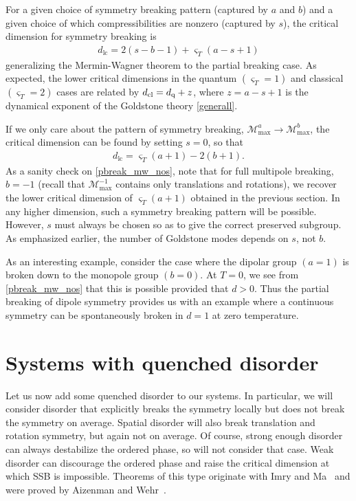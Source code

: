 \documentclass[prb,aps,twocolumn, amsfonts,amsmath,amssymb,nofootinbib,superscriptaddress]{revtex4-2}
\renewcommand{\max}{\text{max}}
\newcommand{\mmax}[1]{\mathcal{M}^{#1}_\max}
\begin{document}
For a given choice of symmetry breaking pattern (captured by $a$ and $b$) and a given choice of which compressibilities are nonzero (captured by $s$), the critical dimension for symmetry breaking is
\begin{align}
d_\text{lc} = 2(s - b-1) + \varsigma_T (a-s+1) \label{pbreak_mw} 
\end{align}
generalizing the Mermin-Wagner theorem to the partial breaking case. 
As expected, the lower critical dimensions in the quantum $(\varsigma_T = 1)$ and classical $(\varsigma_T = 2)$ cases are related by $d_{\rm cl} = d_{\rm q} + z$, where $z=a-s+1$ is the dynamical exponent of the Goldstone theory \eqref{generall}. 

If we only care about the pattern of symmetry breaking, $\mmax{a}\rightarrow \mmax{b}$, the critical dimension can be found by setting $s=0$, so that
\begin{align}
d_\text{lc} = \varsigma_T (a+1) -2 (b+1). \label{pbreak_mw_nos}
\end{align}
As a sanity check on \eqref{pbreak_mw_nos}, note that for full multipole breaking, $b=-1$ (recall that $\mmax{-1}$ contains only translations and rotations), we recover the lower critical dimension of $\varsigma_T(a+1)$ obtained in the previous section. 
In any higher dimension, such a symmetry breaking pattern will be possible. However, $s$ must always be chosen so as to give the correct preserved subgroup. As emphasized earlier, the number of Goldstone modes depends on $s$, not $b$.

As an interesting example, consider the case where the dipolar group $(a=1)$ is broken down to the monopole group $(b=0)$. At $T=0$, we see from \eqref{pbreak_mw_nos} that this is possible provided that $d>0$. Thus the partial breaking of dipole symmetry provides us with an example where a continuous symmetry can be spontaneously broken in $d=1$ at zero temperature. 

\section{Systems with quenched disorder} \label{sec:disord}

Let us now add some quenched disorder to our systems. In particular, we will consider disorder that explicitly breaks the symmetry locally but does not break the symmetry on average. Spatial disorder will also break translation and rotation symmetry, but again not on average. Of course, strong enough disorder can always destabilize the ordered phase, so will not consider that case. Weak disorder can discourage the ordered phase and raise the critical dimension at which SSB is impossible. Theorems of this type originate with Imry and Ma~\cite{ImryMa} and were proved by Aizenman and Wehr~\cite{Aizenman}.
\end{document}
